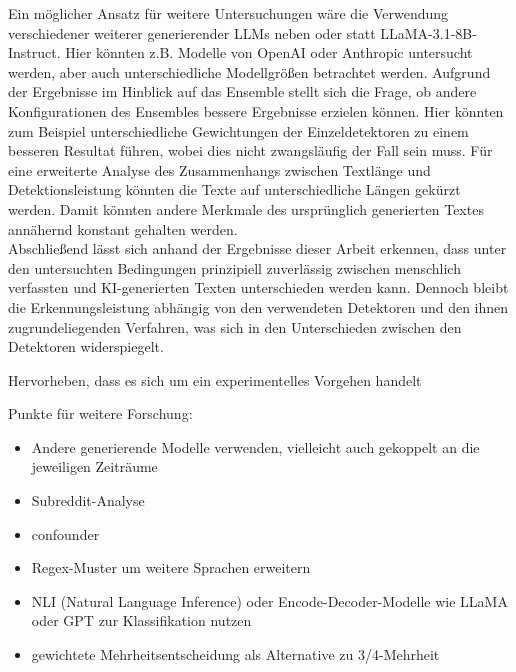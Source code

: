 Ein möglicher Ansatz für weitere Untersuchungen wäre die Verwendung verschiedener weiterer generierender LLMs neben oder statt LLaMA-3.1-8B-Instruct. Hier könnten z.B. Modelle von OpenAI oder Anthropic untersucht werden, aber auch unterschiedliche Modellgrößen betrachtet werden. Aufgrund der Ergebnisse im Hinblick auf das Ensemble stellt sich die Frage, ob andere Konfigurationen des Ensembles bessere Ergebnisse erzielen können. Hier könnten zum Beispiel unterschiedliche Gewichtungen der Einzeldetektoren zu einem besseren Resultat führen, wobei dies nicht zwangsläufig der Fall sein muss. Für eine erweiterte Analyse des Zusammenhangs zwischen Textlänge und Detektionsleistung könnten die Texte auf unterschiedliche Längen gekürzt werden. Damit könnten andere Merkmale des ursprünglich generierten Textes annähernd konstant gehalten werden. \\
Abschließend lässt sich anhand der Ergebnisse dieser Arbeit erkennen, dass unter den untersuchten Bedingungen prinzipiell zuverlässig zwischen menschlich verfassten und KI-generierten Texten unterschieden werden kann. Dennoch bleibt die Erkennungsleistung abhängig von den verwendeten Detektoren und den ihnen zugrundeliegenden Verfahren, was sich in den Unterschieden zwischen den Detektoren widerspiegelt.


Hervorheben, dass es sich um ein experimentelles Vorgehen handelt

Punkte für weitere Forschung:
\begin{itemize}
  \item Andere generierende Modelle verwenden, vielleicht auch gekoppelt an die jeweiligen Zeiträume
  \item Subreddit-Analyse
  \item confounder
  \item Regex-Muster um weitere Sprachen erweitern
  \item NLI (Natural Language Inference) oder Encode-Decoder-Modelle wie LLaMA oder GPT zur Klassifikation nutzen
  \item gewichtete Mehrheitsentscheidung als Alternative zu 3/4-Mehrheit
\end{itemize}
